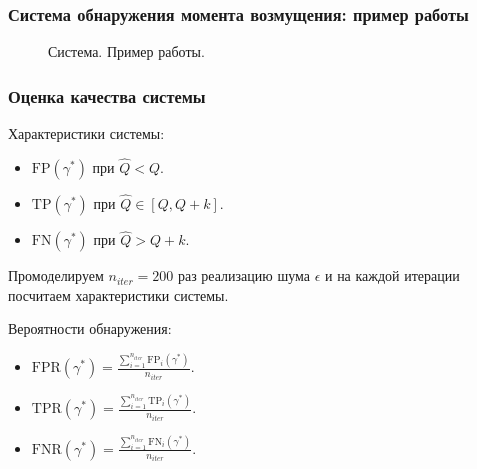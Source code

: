 \documentclass[pdf, 9pt,intlimits, unicode]{beamer}
\begin{document}
	\begin{frame}
		\frametitle{Система обнаружения момента возмущения: пример работы}
			\begin{figure}[!hhh]
				\caption{Система. Пример работы.}
				\label{pic:example_system_work}
			\end{figure}
	\end{frame}
	
	\begin{frame}
		\frametitle{Оценка качества системы}
		{\color{blue} Характеристики системы:}
		\begin{itemize}
			\item $ \mathrm{FP}(\gamma^*) $ при $ \hat{Q} < Q $.
			\item $ \mathrm{TP}(\gamma^*) $ при $ \hat{Q} \in [Q, Q+k] $.
			\item $ \mathrm{FN}(\gamma^*) $ при $ \hat{Q} > Q+k $.
		\end{itemize}
		
		\bigskip 
		Промоделируем $ n_{iter}=200 $ раз реализацию шума $ \epsilon $ и на каждой итерации посчитаем характеристики системы. 
		
		\bigskip
		
		{\color{blue} Вероятности обнаружения:}
		
		\begin{itemize}
			\item  $ \mathrm{FPR}(\gamma^*) = \frac{\sum\limits_{i=1}^{n_{iter}}\mathrm{FP}_i(\gamma^*)}{n_{iter}} $.
			\item $ \mathrm{TPR}(\gamma^*) = \frac{\sum\limits_{i=1}^{n_{iter}}\mathrm{TP}_i(\gamma^*)}{n_{iter}} $.
			\item $ \mathrm{FNR}(\gamma^*) = \frac{\sum\limits_{i=1}^{n_{iter}}\mathrm{FN}_i(\gamma^*)}{n_{iter}} $.
		\end{itemize}
	\end{frame}
\end{document}
